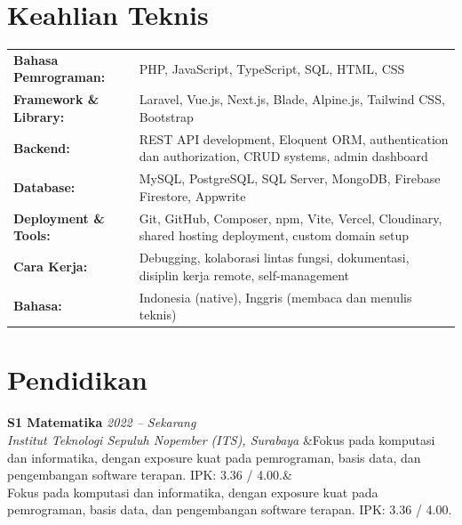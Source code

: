 \documentclass[a4paper,11pt]{article}
\newcommand{\cventry}[4]{%
  \noindent\textbf{#1} \hfill \textit{#3} \\
  \textit{#2}
  \ifx&#4& \else \\ \small #4 \fi
  \vspace{6pt}
}
\begin{document}
\section{Keahlian Teknis}
\begin{tabularx}{\textwidth}{@{}l X@{}}
\textbf{Bahasa Pemrograman:} & PHP, JavaScript, TypeScript, SQL, HTML, CSS \\[3pt]
\textbf{Framework \& Library:} & Laravel, Vue.js, Next.js, Blade, Alpine.js, Tailwind CSS, Bootstrap \\[3pt]
\textbf{Backend:} & REST API development, Eloquent ORM, authentication dan authorization, CRUD systems, admin dashboard \\[3pt]
\textbf{Database:} & MySQL, PostgreSQL, SQL Server, MongoDB, Firebase Firestore, Appwrite \\[3pt]
\textbf{Deployment \& Tools:} & Git, GitHub, Composer, npm, Vite, Vercel, Cloudinary, shared hosting deployment, custom domain setup \\[3pt]
\textbf{Cara Kerja:} & Debugging, kolaborasi lintas fungsi, dokumentasi, disiplin kerja remote, self-management \\[3pt]
\textbf{Bahasa:} & Indonesia (native), Inggris (membaca dan menulis teknis) \\
\end{tabularx}

\section{Pendidikan}
\cventry
  {S1 Matematika}
  {Institut Teknologi Sepuluh Nopember (ITS), Surabaya}
  {2022 -- Sekarang}
  {Fokus pada komputasi dan informatika, dengan exposure kuat pada pemrograman, basis data, dan pengembangan software terapan. IPK: 3.36 / 4.00.}
\end{document}
